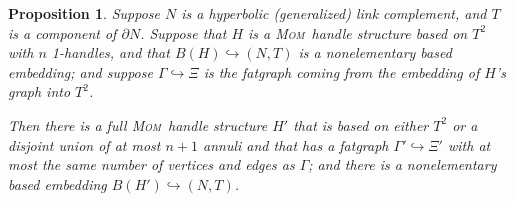 \documentclass{article}
\theoremstyle{plain}
\newtheorem{proposition}[theorem]{Proposition}
\theoremstyle{plain}
\theoremstyle{definition}
\numberwithin{equation}{section}
\newcommand{\MOM}{\textsc{Mom}}
\begin{document}
\begin{proposition}
Suppose $N$ is a hyperbolic (generalized) link complement,
and $T$ is a component of $\partial N$. Suppose that $H$
is a \MOM\ handle structure based on $T^2$ with $n$ 1-handles, and that
$B(H) \hookrightarrow (N, T)$ is a nonelementary based embedding;
and suppose $\Gamma \hookrightarrow \Xi$ is the fatgraph
coming from the embedding of $H$'s graph into $T^2$.

Then there is a full \MOM\ handle structure $H'$ that is based on
either $T^2$ or a disjoint union of at most $n+1$ annuli
and that has a fatgraph $\Gamma' \hookrightarrow \Xi'$ with
at most the same number of vertices and edges as $\Gamma$; and
there is a nonelementary based embedding $B(H') \hookrightarrow (N, T)$.
\end{proposition}
\end{document}
